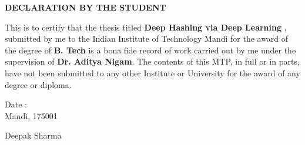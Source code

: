\thispagestyle{empty}
\setcounter{page}{0}
\vspace*{4cm}
\centerline{\Large \bf DECLARATION BY THE STUDENT}
\vspace*{2cm}
\noindent This is to certify that the thesis titled {\bf Deep Hashing via Deep Learning
}, submitted by me to the Indian Institute of Technology Mandi for the award of the degree of {\bf B. Tech} is a bona fide record of work carried out by me under the supervision of {\bf Dr. Aditya Nigam}. The contents of this MTP, in full or in parts, have not been submitted to any other Institute or University for the award of any degree or diploma.\\[3cm]
%
\begin{minipage}{7cm}
	{Date :}\\
	Mandi, 175001 
\end{minipage}
\hfill\begin{minipage}{7cm}
	\centering
	Deepak Sharma 	
\end{minipage}


\clearpage
\thispagestyle{empty}




